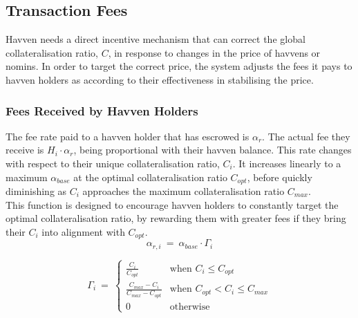 \newpage
\subsection{Transaction Fees}
Havven needs a direct incentive mechanism that can correct the global
collateralisation ratio, \(C\), in response to changes in the price of havvens
or nomins. In order to target the correct price, the system adjusts the fees
it pays to havven holders as according to their effectiveness in stabilising
the price.

\subsubsection{Fees Received by Havven Holders}

\noindent The fee rate paid to a havven holder that has escrowed is
\(\alpha_r\). The actual fee they receive is \(H_i \cdot \alpha_r\), being
proportional with their havven balance. This rate changes with respect to
their unique collateralisation ratio, \(C_i\). It increases linearly to a
maximum \(\alpha_{base}\) at the optimal collateralisation ratio \(C_{opt}\),
before quickly diminishing as \(C_i\) approaches the maximum collateralisation
ratio \(C_{max}\). \\

\noindent This function is designed to encourage havven holders to constantly
target the optimal collateralisation ratio, by rewarding them with greater
fees if they bring their \(C_i\) into alignment with \(C_{opt}\).\\

\begin{equation}
\alpha_{r,i} \ = \ \alpha_{base} \cdot \mathit{\Gamma}_{i}  \label{eq:feesreceived}
\end{equation}

\begin{equation}
\mathit{\Gamma}_{i} \ = \
\begin{cases}
 \frac{C_{i}}{C_{opt}} &\mbox{when } C_{i} \leq C_{opt} \\[1em]
 \frac{C_{max} - C_{i}}{C_{max} - C_{opt}} &\mbox{when } C_{opt} < C_{i} \leq C_{max} \\[1em]
 0 &\mbox{otherwise}
 \end{cases}
 \label{eq:7}
\end{equation}

\begin{center}
\end{center}

